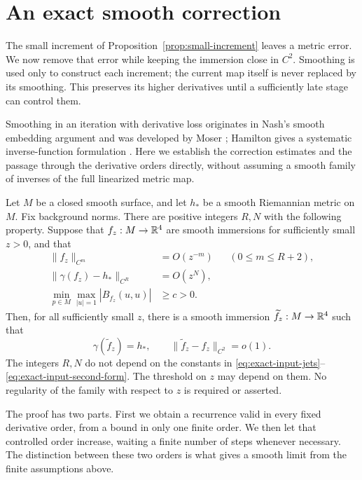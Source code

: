 \section{An exact smooth correction}
\label{sec:exact-correction}

The small increment of Proposition~\ref{prop:small-increment} leaves a
metric error.  We now remove that error while keeping the immersion
close in $C^2$.  Smoothing is used only to construct each increment;
the current map itself is never replaced by its smoothing.  This
preserves its higher derivatives until a sufficiently late stage can
control them.

Smoothing in an iteration with derivative loss originates in Nash's
smooth embedding argument \cite[Part~A]{Nash1956} and was developed by
Moser \cite[Chapter~I, \S\S1 and~5]{Moser1966}; Hamilton gives a systematic
inverse-function formulation \cite[Part~III]{Hamilton1982}.
Here we establish the correction estimates and the passage through the
derivative orders directly, without assuming a smooth family of inverses
of the full linearized metric map.

\begin{proposition}\label{prop:exact-correction}
Let $M$ be a closed smooth surface, and let $h_*$ be a smooth Riemannian
metric on $M$.  Fix background norms.  There are positive integers
$R,N$ with the following property.  Suppose that $f_z:M\to\mathbb{R}^4$ are
smooth immersions for sufficiently small $z>0$, and that
\begin{align}
 \|f_z\|_{C^m}&=O(z^{-m}) &&(0\le m\le R+2),\label{eq:exact-input-jets}\\
 \|\gamma(f_z)-h_*\|_{C^R}&=O(z^N),\label{eq:exact-input-metric}\\
 \min_{p\in M}\max_{|u|=1}|B_{f_z}(u,u)|&\ge c>0.
 \label{eq:exact-input-second-form}
\end{align}
Then, for all sufficiently small $z$, there is a smooth immersion
$\widetilde f_z:M\to\mathbb{R}^4$ such that
\[
 \gamma(\widetilde f_z)=h_*,\qquad
 \|\widetilde f_z-f_z\|_{C^2}=o(1).
\]
The integers $R,N$ do not depend on the constants in
\eqref{eq:exact-input-jets}--\eqref{eq:exact-input-second-form}.
The threshold on $z$ may depend on them.  No regularity of the family
with respect to $z$ is required or asserted.
\end{proposition}

The proof has two parts.  First we obtain a recurrence valid in every
fixed derivative order, from a bound in only one finite order.  We
then let that controlled order increase, waiting a finite number of
steps whenever necessary.  The distinction between these two orders
is what gives a smooth limit from the finite assumptions above.


